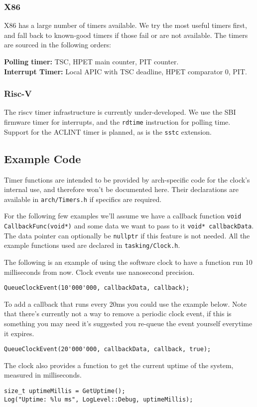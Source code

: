 \subsubsection{X86}
X86 has a large number of timers available. We try the most useful timers first, and fall back to known-good timers if those fail or are not available. The timers are sourced in the following orders:

\textbf{Polling timer:} TSC, HPET main counter, PIT counter.\\
\textbf{Interrupt Timer:} Local APIC with TSC deadline, HPET comparator 0, PIT.

\subsubsection{Risc-V}
The riscv timer infrastructure is currently under-developed. We use the SBI firmware timer for interrupts, and the \verb|rdtime| instruction for polling time. Support for the ACLINT timer is planned, as is the \verb|sstc| extension.

\subsection{Example Code}
Timer functions are intended to be provided by arch-specific code for the clock's internal use, and therefore won't be documented here. Their declarations are available in \verb|arch/Timers.h| if specifics are required.

For the following few examples we'll assume we have a callback function \verb|void CallbackFunc(void*)| and some data we want to pass to it \verb|void* callbackData|. The data pointer can optionally be \verb|nullptr| if this feature is not needed. All the example functions used are declared in \verb|tasking/Clock.h|.

The following is an example of using the software clock to have a function run 10 milliseconds from now. Clock events use nanosecond precision.
\begin{verbatim}
QueueClockEvent(10'000'000, callbackData, callback);
\end{verbatim}

To add a callback that runs every 20ms you could use the example below. Note that there's currently not a way to remove a periodic clock event, if this is something you may need it's suggested you re-queue the event yourself everytime it expires.
\begin{verbatim}
QueueClockEvent(20'000'000, callbackData, callback, true);
\end{verbatim}

The clock also provides a function to get the current uptime of the system, measured in milliseconds.
\begin{verbatim}
size_t uptimeMillis = GetUptime();
Log("Uptime: %lu ms", LogLevel::Debug, uptimeMillis);
\end{verbatim}
